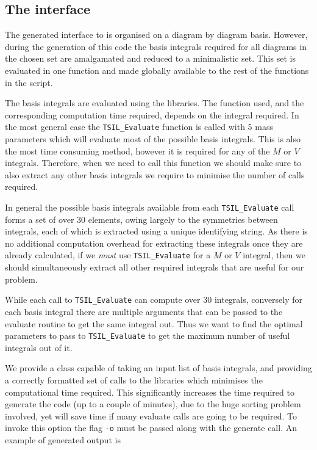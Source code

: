 \subsection{The \tsil interface}\label{sec:tsil_interface}

The generated \CC interface to \tsil is organised on a diagram by diagram basis.  However, during the generation of this code the basis integrals required for all diagrams in the chosen set are amalgamated and reduced to a minimalistic set.  This set is evaluated in one function and made globally available to the rest of the functions in the script.

The basis integrals are evaluated using the \tsil libraries.  The function used, and the corresponding computation time required, depends on the integral required.  In the most general case the \lstinline{TSIL_Evaluate} function is called with 5 mass parameters which will evaluate most of the possible basis integrals.  This is also the most time consuming method, however it is required for any of the $M$ or $V$ integrals.  Therefore, when we need to call this function we should make sure to also extract any other basis integrals we require to minimise the number of calls required.

In general the possible basis integrals available from each \lstinline{TSIL_Evaluate} call forms a set of over 30 elements, owing largely to the symmetries between integrals, each of which is extracted using a unique identifying string.  As there is no additional computation overhead for extracting these integrals once they are already calculated, if we \textit{must} use \lstinline{TSIL_Evaluate} for a $M$ or $V$ integral, then we should simultaneously extract all other required integrals that are useful for our problem.

While each call to \lstinline{TSIL_Evaluate} can compute over 30 integrals, conversely for each basis integral there are multiple arguments that can be passed to the evaluate routine to get the same integral out.  Thus we want to find the optimal parameters to pass to  \lstinline{TSIL_Evaluate} to get the maximum number of useful integrals out of it.

We provide a class capable of taking an input list of basis integrals, and providing a correctly formatted set of calls to the \tsil libraries which minimises the computational time required.  This significantly increases the time required to generate the code (up to a couple of minutes), due to the huge sorting problem involved, yet will save time if many evaluate calls are going to be required.  To invoke this option the flag \lstinline{-o} must be passed along with the generate call.  An example of generated output is

